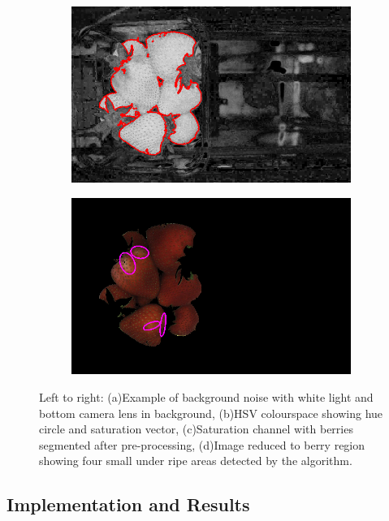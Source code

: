 \documentclass[fleqn,twoside]{article}
\begin{document}
\begin{figure}[ht]
	\begin{subfigure}{.4\textwidth}
		\centering
		\includegraphics[width=.9\linewidth]{sat_thresh.png}
		\caption{}
		\label{fig:sat_thresh}
	\end{subfigure}%
	\begin{subfigure}{.4\textwidth}
		\centering
		\includegraphics[width=.9\linewidth]{hue_processed.png}
		\caption{}
		\label{fig:hue_processed}
	\end{subfigure}%

	\caption{Left to right: (a)Example of background noise with white light and bottom camera lens in background, (b)HSV colourspace showing hue circle and saturation vector, (c)Saturation channel with berries segmented after pre-processing, (d)Image reduced to berry region showing four small under ripe areas detected by the algorithm.}
	\label{fig:test2}
\end{figure}



\subsection{Implementation and Results}
\end{document}
